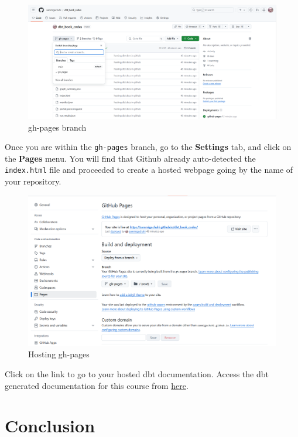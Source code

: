 \documentclass[
]{book}
\begin{document}
\begin{figure}
\centering
\includegraphics{./images/gh-pages-branch.png}
\caption{gh-pages branch}
\end{figure}

Once you are within the \texttt{gh-pages} branch, go to the \textbf{Settings} tab, and click on the \textbf{Pages} menu. You will find that Github already auto-detected the \texttt{index.html} file and proceeded to create a hosted webpage going by the name of your repository.

\begin{figure}
\centering
\includegraphics{./images/gh-pages-hosting.png}
\caption{Hosting gh-pages}
\end{figure}

Click on the link to go to your hosted dbt documentation. Access the dbt generated documentation for this course from \href{https://sammigachuhi.github.io/dbt_book_codes/\#!/overview}{here}.

\hypertarget{conclusion}{%
\chapter{Conclusion}\label{conclusion}}
\end{document}
